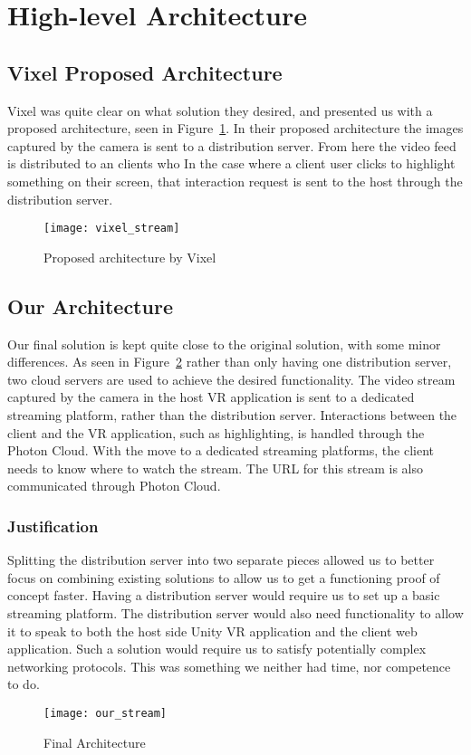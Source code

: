 \section{High-level Architecture}
\subsection{Vixel Proposed Architecture}
Vixel was quite clear on what solution they desired, and presented us with a proposed architecture, seen in Figure~\ref{fig:proposed_architecture}. In their proposed architecture the images captured by the camera is sent to a distribution server. From here the video feed is distributed to an clients who 
In the case where a client user clicks to highlight something on their screen, that interaction request is sent to the host through the distribution server.


\begin{figure}
    \texttt{[image: vixel\_stream]}
    \caption{Proposed architecture by Vixel}
    \label{fig:proposed_architecture}
\end{figure}

\subsection{Our Architecture}
Our final solution is kept quite close to the original solution, with some minor differences. As seen in Figure~\ref{fig:our_architecture} rather than only having one distribution server, two cloud servers are used to achieve the desired functionality. The video stream captured by the camera in the host VR application is sent to a dedicated streaming platform, rather than the distribution server. Interactions between the client and the VR application, such as highlighting, is handled through the Photon Cloud. With the move to a dedicated streaming platforms, the client needs to know where to watch the stream. The URL for this stream is also communicated through Photon Cloud.

\subsubsection{Justification}
Splitting the distribution server into two separate pieces allowed us to better focus on combining existing solutions to allow us to get a functioning proof of concept faster. Having a distribution server would require us to set up a basic streaming platform. The distribution server would also need functionality to allow it to speak to both the host side Unity VR application and the client web application. Such a solution would require us to satisfy potentially complex networking protocols. This was something we neither had time, nor competence to do.

\begin{figure}
    \texttt{[image: our\_stream]}
    \caption{Final Architecture}
    \label{fig:our_architecture}
\end{figure}